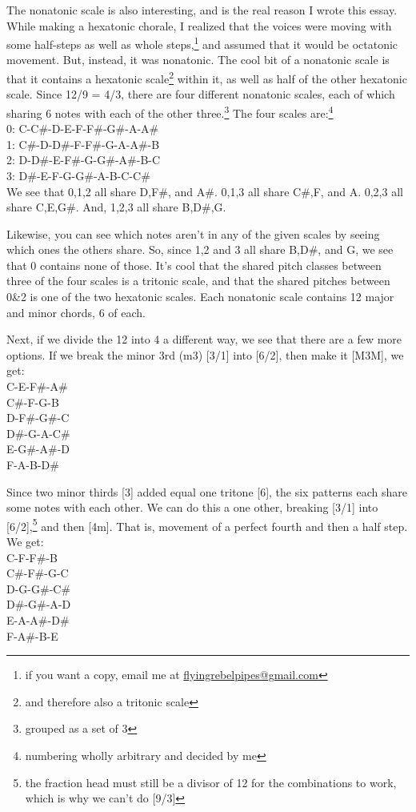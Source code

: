 \documentclass[12pt]{article}[titlepage]
\newcommand{\1}{\={a}}
\newcommand{\2}{\={e}}
\newcommand{\3}{\={\i}}
\newcommand{\4}{\=o}
\newcommand{\5}{\=u}
\newcommand{\6}{\={A}}
\renewcommand{\,}{\textsuperscript{,}}
\begin{document}
The nonatonic scale is also interesting, and is the real reason I wrote this essay.
While making a hexatonic chorale, I realized that the voices were moving with some half-steps as well as whole steps,\footnote{if you want a copy, email me at \href{mailto:flyingrebelpipes@gmail.com}{flyingrebelpipes@gmail.com}} and assumed that it would be octatonic movement.
But, instead, it was nonatonic.
The cool bit of a nonatonic scale is that it contains a hexatonic scale\footnote{and therefore also a tritonic scale} within it, as well as half of the other hexatonic scale.
Since 12/9 = 4/3, there are four different nonatonic scales, each of which sharing 6 notes with each of the other three.\footnote{grouped as a set of 3}
The four scales are:\footnote{numbering wholly arbitrary and decided by me}\\
0: C-C\#-D-E-F-F\#-G\#-A-A\#\\
1: C\#-D-D\#-F-F\#-G-A-A\#-B\\
2: D-D\#-E-F\#-G-G\#-A\#-B-C\\
3: D\#-E-F-G-G\#-A-B-C-C\#\\

We see that 0,1,2 all share D,F\#, and A\#.
0,1,3 all share C\#,F, and A.
0,2,3 all share C,E,G\#.
And, 1,2,3 all share B,D\#,G.

Likewise, you can see which notes aren't in any of the given scales by seeing which ones the others share.
So, since 1,2 and 3 all share B,D\#, and G, we see that 0 contains none of those.
It's cool that the shared pitch classes between three of the four scales is a tritonic scale, and that the shared pitches between 0\&2 is one of the two hexatonic scales.
Each nonatonic scale contains 12 major and minor chords, 6 of each.

Next, if we divide the 12 into 4 a different way, we see that there are a few more options.
If we break the minor 3rd (m3) [3/1] into [6/2], then make it [M3M], we get:\\
C-E-F\#-A\#\\
C\#-F-G-B\\
D-F\#-G\#-C\\
D\#-G-A-C\#\\
E-G\#-A\#-D\\
F-A-B-D\#

Since two minor thirds [3] added equal one tritone [6], the six patterns each share some notes with each other.
We can do this a one other, breaking [3/1] into [6/2],\footnote{the fraction head must still be a divisor of 12 for the combinations to work, which is why we can't do [9/3]} and then [4m].
That is, movement of a perfect fourth and then a half step.
We get:\\
C-F-F\#-B\\
C\#-F\#-G-C\\
D-G-G\#-C\#\\
D\#-G\#-A-D\\
E-A-A\#-D\#\\
F-A\#-B-E
\end{document}
